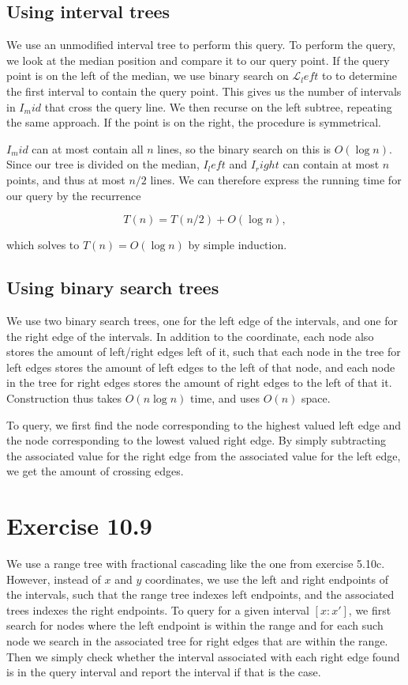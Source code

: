 \documentclass[11pt,a4paper]{article}
\begin{document}
\subsection{Using interval trees}

We use an unmodified interval tree to perform this query. To perform the
query, we look at the median position and compare it to our query point.
If the query point is on the left of the median, we use binary search on
$\mathcal{L}_left$ to to determine the first interval to contain the query
point. This gives us the number of intervals in $I_mid$ that cross the query
line. We then recurse on the left subtree, repeating the same approach.
If the point is on the right, the procedure is symmetrical.

$I_mid$ can at most contain all $n$ lines, so the binary search on this is
$O(\log n)$. Since our tree is divided on the median, $I_left$ and $I_right$
can contain at most $n$ points, and thus at most $n/2$ lines. We can therefore
express the running time for our query by the recurrence

\[ T(n) = T(n/2) + O(\log n), \]

which solves to $T(n) = O(\log n)$ by simple induction.

\subsection{Using binary search trees}

We use two binary search trees, one for the left edge of the
intervals, and one for the right edge of the intervals. In addition to
the coordinate, each node also stores the amount of left/right edges
left of it, such that each node in the tree for left edges stores the
amount of left edges to the left of that node, and each node in the
tree for right edges stores the amount of right edges to the left of
that it. Construction thus takes $O(n \log n)$ time, and uses $O(n)$
space.

To query, we first find the node corresponding to the highest valued
left edge and the node corresponding to the lowest valued right
edge. By simply subtracting the associated value for the right edge
from the associated value for the left edge, we get the amount of
crossing edges.

\section{Exercise 10.9}

We use a range tree with fractional cascading like the one from
exercise 5.10c. However, instead of $x$ and $y$ coordinates, we use
the left and right endpoints of the intervals, such that the range
tree indexes left endpoints, and the associated trees indexes the
right endpoints. To query for a given interval $[x:x']$, we first
search for nodes where the left endpoint is within the range and for
each such node we search in the associated tree for right edges that
are within the range. Then we simply check whether the interval
associated with each right edge found is in the query interval and
report the interval if that is the case.
\end{document}
